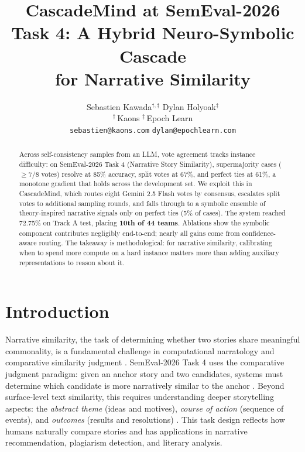 \documentclass[11pt]{article}
\title{CascadeMind at SemEval-2026 Task 4: A Hybrid Neuro-Symbolic Cascade \\for Narrative Similarity}
\author{Sebastien Kawada$^{\dagger,\ddagger}$ \hspace{1cm} Dylan Holyoak$^{\ddagger}$ \\
  $^{\dagger}$\,Kaons \quad $^{\ddagger}$\,Epoch Learn \\
  \texttt{sebastien@kaons.com} \quad \texttt{dylan@epochlearn.com}}
\begin{document}
\maketitle

\begin{abstract}
Across self-consistency samples from an LLM, vote agreement tracks instance difficulty: on SemEval-2026 Task 4 (Narrative Story Similarity), supermajority cases ($\geq 7/8$ votes) resolve at 85\% accuracy, split votes at 67\%, and perfect ties at 61\%, a monotone gradient that holds across the development set. We exploit this in CascadeMind, which routes eight Gemini 2.5 Flash votes by consensus, escalates split votes to additional sampling rounds, and falls through to a symbolic ensemble of theory-inspired narrative signals only on perfect ties (5\% of cases). The system reached 72.75\% on Track A test, placing \textbf{10th of 44 teams}. Ablations show the symbolic component contributes negligibly end-to-end; nearly all gains come from confidence-aware routing. The takeaway is methodological: for narrative similarity, calibrating when to spend more compute on a hard instance matters more than adding auxiliary representations to reason about it.
\end{abstract}

\section{Introduction}

Narrative similarity, the task of determining whether two stories share meaningful commonality, is a fundamental challenge in computational narratology and comparative similarity judgment \citep{piper2021narrative,tversky1977features}. SemEval-2026 Task 4 uses the comparative judgment paradigm: given an anchor story and two candidates, systems must determine which candidate is more narratively similar to the anchor \citep{hatzel-etal-2026-semeval}. Beyond surface-level text similarity, this requires understanding deeper storytelling aspects: the \emph{abstract theme} (ideas and motives), \emph{course of action} (sequence of events), and \emph{outcomes} (results and resolutions) \citep{hatzel-etal-2026-semeval}. This task design reflects how humans naturally compare stories and has applications in narrative recommendation, plagiarism detection, and literary analysis. 
\end{document}
